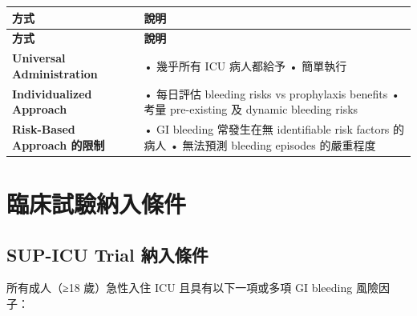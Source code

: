 \documentclass[12pt,a4paper]{article}
\begin{document}
\begin{longtable}{p{4cm}p{10cm}}
\toprule
\textbf{方式} & \textbf{說明} \\
\midrule
\endfirsthead

\toprule
\textbf{方式} & \textbf{說明} \\
\midrule
\endhead

\bottomrule
\endfoot

\textbf{Universal Administration} &
• 幾乎所有 ICU 病人都給予\newline
• 簡單執行 \\
\midrule
\textbf{Individualized Approach} &
• 每日評估 bleeding risks vs prophylaxis benefits\newline
• 考量 pre-existing 及 dynamic bleeding risks \\
\midrule
\textbf{Risk-Based Approach 的限制} &
• GI bleeding 常發生在無 identifiable risk factors 的病人\newline
• 無法預測 bleeding episodes 的嚴重程度 \\
\bottomrule
\end{longtable}

\section{臨床試驗納入條件}

\subsection{SUP-ICU Trial 納入條件}

所有成人（≥18 歲）急性入住 ICU 且具有以下一項或多項 GI bleeding 風險因子：
\end{document}

